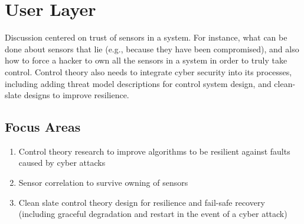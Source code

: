 \documentclass[11pt]{article}
\begin{document}
\section{User Layer}

Discussion centered on trust of sensors in a system.  For instance,
what can be done about sensors that lie (e.g., because they have been
compromised), and also how to force a hacker to own all the sensors in
a system in order to truly take control.  Control theory also needs to
integrate cyber security into its processes, including adding threat
model descriptions for control system design, and clean-slate designs
to improve resilience.

\subsection{Focus Areas}

\begin{enumerate}
	\item Control theory research to improve algorithms
	to be resilient against faults caused by cyber attacks
	\item Sensor correlation to survive owning of sensors
	\item Clean slate control theory design for resilience and
	fail-safe recovery (including graceful degradation and restart in the
	event of a cyber attack)
\end{enumerate}
\end{document}

